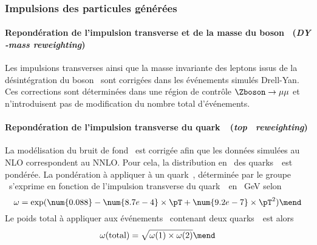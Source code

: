 \subsubsection{Impulsions des particules générées}
\paragraph{Repondération de l'impulsion transverse et de la masse du boson \Zboson\ (\emph{DY \pT-mass reweighting})}
Les impulsions transverses ainsi que la masse invariante des leptons issus de la désintégration du boson \Zboson\ sont corrigées
dans les événements simulés Drell-Yan.
Ces corrections sont déterminées dans une région de contrôle $\Zboson\to\mu\mu$ et n'introduisent pas de modification du nombre total d'événements.
\paragraph{Repondération de l'impulsion transverse du quark~\quarkt\ (\emph{top \pT\ reweighting})}
La modélisation du bruit de fond \ttbar\ est corrigée afin que les données simulées au NLO correspondent au NNLO.
Pour cela, la distribution en \pT\ des quarks~\quarkt\ est pondérée.
La pondération à appliquer à un quark~\quarkt, déterminée par le groupe \quarkt\antiquarkt\Higgs\ s'exprime en fonction de l'impulsion transverse du quark~\quarkt\ en \SI{}{\GeV} selon
\begin{equation}
\omega = \exp(\num{0.088} - \num{8.7e-4}\times\pT + \num{9.2e-7}\times\pT^2)
\mend
\end{equation}
Le poids total à appliquer aux événements \ttbar\ contenant deux quarks~\quarkt\ est alors
\begin{equation}
\omega(\text{total}) = \sqrt{\omega(1) \times \omega(2)}
\mend
\end{equation}